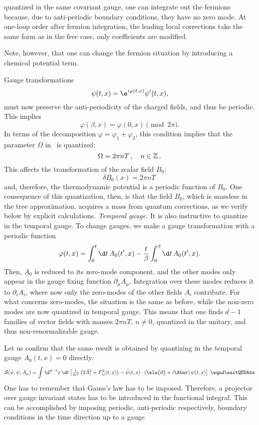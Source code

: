 quantized in the same covariant gauge,
one can integrate out the fermions because, due to
anti-periodic boundary conditions, they have no zero mode.  At one-loop order after fermion integration, the leading local corrections take the same form as in the free case, only coefficients are modified.  \par
Note, however, that one can change the fermion situation by introducing
a  chemical  potential term. \par
Gauge transformations
$$\psib(t,x)=\e^{i \varphi (t,x)}\psib'(t,x), $$
must now preserve the anti-periodicity of the charged fields, and thus be periodic. This implies
$$\varphi( \beta ,x)=\varphi (0,x) \pmod{ 2\pi} .$$
In terms of the decomposition $\varphi=\varphi_1+\varphi_2$, this condition implies that the parameter $\Omega $ in \eNTBQgau\ is quantized:
$$\Omega =2 \pi n T\,,\quad n\in{\Bbb Z}\,.$$
This affects the transformation of the scalar field $B_0$:
$$\delta B_0(x)=2 \pi n T\,$$
and, therefore, the thermodynamic potential is a periodic function of
$B_0$. One consequence of this quantization, then, is that
the field $B_0$, which is massless in the tree approximation, acquires a mass  from quantum corrections, as we verify below by explicit calculations.
\smallskip
{\it Temporal gauge.}
It is also instructive to quantize in the temporal gauge.  To change gauges, we make a gauge transformation with a periodic function
$$ \varphi(t,x)=\int_0^t \d t\, A_0(t',x)-{t\over \beta }\int_0^\beta  \d t\,
A_0(t',x) .$$
Then, $A_0$ is reduced to its zero-mode component, and
the other modes only appear in the gauge fixing function $ \partial_\mu
A_\mu$. Integration over these modes reduces it to $ \partial_i A_i$, where
now only the zero-modes of the other fields $A_i$ contribute.
For what concerns zero-modes, the situation is the same as before,
while the non-zero modes are now quantized in temporal gauge.
This means that one finds $d-1$ families of vector fields with masses $2\pi
n T$, $n\ne 0$, quantized in the unitary, and thus non-renormalizable gauge.
 \par
Let us confirm that the same result is obtained by  quantizing in the temporal gauge $A_0(t,x)=0$ directly:
$$ {\cal S} (\bar \psib ,\psib,A _{\mu}  ) = \int \d^{d-1}x\,\d t
\left[{\textstyle{ 1 \over 4e^2}}\left(2\dot A_i^2+  F ^{2} _{ij}(t,x)
\right)- \bar \psib (t,x) \cdot\left(\sla{ \partial} + i\Abar \right)
\psib(t,x) \right]. \eqnd\eactQEDAze $$
One has to remember that Gauss's law has to be imposed. Therefore,
a projector over gauge invariant states has to be introduced in the functional integral. This can be accomplished by imposing periodic, anti-periodic respectively, boundary conditions in the time direction up to a gauge
